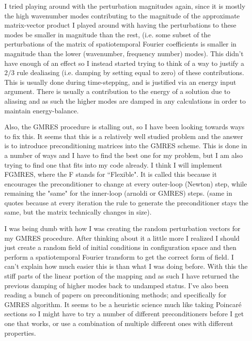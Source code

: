 I tried playing around with the perturbation magnitudes again, since it is mostly the high wavenumber modes contributing to the
magnitude of the approximate matrix-vector product I played around with having the perturbations to these modes be smaller in
magnitude than the rest, (i.e. some subset of the perturbations of the matrix of spatiotemporal Fourier coefficients is smaller in
magnitude than the lower (wavenumber, frequency number) modes). This didn't have enough of an effect so I instead started trying
to think of a way to justify a $2/3$ rule dealiasing (i.e. damping by setting equal to zero) of these contributions. This is
usually done during time-stepping, and is justified via an energy input argument. There is usually a contribution to the energy
of a solution due to aliasing and as such the higher modes are damped in any calculations in order to maintain energy-balance.

Also, the GMRES procedure is stalling out, so I have been looking towards ways to fix this. It seems that this is a relatively
well studied problem and the answer is to introduce preconditioning matrices into the GMRES scheme. This is done in a number
of ways and I have to find the best one for my problem, but I am also trying to find one that fits into my code already.
I think I will implement FGMRES, where the F stands for ``Flexible". It is called this because it
encourages the preconditioner to change at every outer-loop (Newton) step, while remaining the "same" for the inner-loop (arnoldi or GMRES)
steps. (same in quotes because at every iteration the rule to generate the preconditioner stays the same, but the matrix technically
changes in size).

I was being dumb with how I was creating the random perturbation vectors for my
GMRES procedure. After thinking about it a little more I realized I should just
create a random field of initial conditions in configuration space and then perform
a spatiotemporal Fourier transform to get the correct form of field. I can't explain
how much easier this is than what I was doing before. With this the stiff parts of the
linear portion of the mapping and as such I have returned the previous damping
of higher modes back to undamped status.
I've also been reading a bunch of
papers on
preconditioning methods; and specifically for GMRES algorithm. It seems to be
a heuristic science much like taking Poincar\'e sections so I might have to
try a number of different preconditioners before I get one that works, or use
a combination of multiple different ones with different properties.

